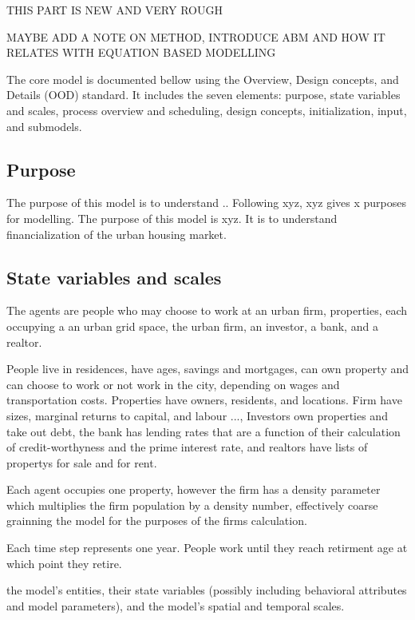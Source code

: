 {{THIS PART IS NEW AND VERY ROUGH

MAYBE ADD A NOTE ON METHOD, INTRODUCE ABM AND HOW IT RELATES WITH EQUATION BASED MODELLING

The core model is documented bellow using the Overview, Design concepts, and Details (OOD) standard. It includes the seven elements: purpose, state variables and scales, process overview and scheduling, design concepts, initialization, input, and submodels.

\subsection{Purpose}

The purpose of this model is to understand ..
Following xyz, xyz gives x purposes for modelling. The purpose of this model is xyz. It is to understand financialization of the urban housing market. 


\subsection{State variables and scales}

The agents are people who may choose to work at an urban firm, properties, each occupying a an urban grid space, the urban firm, an investor, a bank, and a realtor.

People live in residences, have ages, savings and mortgages, can own property and can choose to work or not work in the city, depending on wages and transportation costs. Properties have owners, residents, and locations. Firm have sizes, marginal returns to capital, and labour ..., 
Investors own properties and take out debt, the bank has lending rates that are a function of their calculation of credit-worthyness and the prime interest rate, and realtors have lists of propertys for sale and for rent. 

Each agent occupies one property, however the firm has a density parameter which multiplies the firm population by a density number, effectively coarse grainning the model for the purposes of the firms calculation.

Each time step represents one year. People work until they reach retirment age at which point they retire. 

the model’s entities, their state variables (possibly including behavioral attributes and model parameters), and the model’s spatial and temporal scales.

}}
